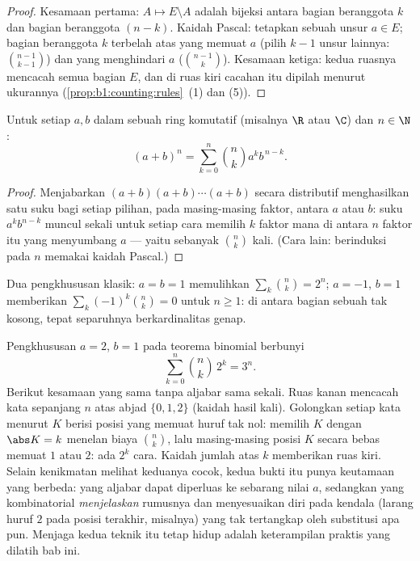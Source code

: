 \begin{proof}
Kesamaan pertama: $A \mapsto E \setminus A$ adalah bijeksi antara
 bagian beranggota $k$ dan  bagian beranggota $(n-k)$. Kaidah Pascal:
tetapkan sebuah unsur $a \in E$;  bagian beranggota $k$ terbelah atas yang memuat
$a$ (pilih $k - 1$ unsur lainnya: $\binom{n-1}{k-1}$) dan yang menghindari
$a$ ($\binom{n-1}{k}$). Kesamaan ketiga: kedua ruasnya mencacah semua  bagian
$E$, dan di ruas kiri cacahan itu dipilah menurut ukurannya
(\cref{prop:b1:counting:rules}~(1) dan (5)).
\end{proof}

\begin{theorem}\label{thm:b1:counting:binomial}
Untuk setiap $a, b$ dalam sebuah ring komutatif (misalnya $\R$ atau $\C$) dan $n \in \N$:
\[
(a + b)^n = \sum_{k=0}^{n} \binom{n}{k} a^k b^{\,n-k} .
\]
\end{theorem}

\begin{proof}
Menjabarkan $(a+b)(a+b)\cdots(a+b)$ secara distributif menghasilkan satu suku bagi setiap
pilihan, pada masing-masing faktor, antara $a$ atau $b$: suku $a^k b^{n-k}$
muncul sekali untuk setiap cara memilih $k$ faktor mana di antara $n$ faktor itu yang
menyumbang $a$ --- yaitu sebanyak $\binom nk$ kali. (Cara lain: berinduksi
pada $n$ memakai kaidah Pascal.)
\end{proof}

\begin{example}\label{ex:b1:counting:binomial}
Dua pengkhususan klasik: $a = b = 1$ memulihkan $\sum_k \binom nk
= 2^n$; $a = -1$, $b = 1$ memberikan $\sum_{k} (-1)^k \binom nk = 0$ untuk
$n \geq 1$: di antara  bagian sebuah  tak kosong, tepat separuhnya
berkardinalitas genap.
\end{example}

\begin{example}\label{ex:b1:counting:threen}
Pengkhususan $a = 2$, $b = 1$ pada teorema binomial berbunyi
\[
\sum_{k=0}^{n} \binom nk\,2^k = 3^n .
\]
Berikut kesamaan yang sama tanpa aljabar sama sekali. Ruas kanan
mencacah kata sepanjang $n$ atas abjad $\{0, 1, 2\}$
(kaidah hasil kali). Golongkan setiap kata menurut  $K$ berisi posisi
yang memuat huruf tak nol: memilih $K$ dengan $\abs K = k$ menelan biaya
$\binom nk$, lalu masing-masing posisi $K$ secara bebas memuat $1$
atau $2$: ada $2^k$ cara. Kaidah jumlah atas $k$ memberikan ruas kiri.
Selain kenikmatan melihat keduanya cocok, kedua bukti itu punya keutamaan
yang berbeda: yang aljabar dapat diperluas ke sebarang nilai $a$, sedangkan yang
kombinatorial \emph{menjelaskan} rumusnya dan menyesuaikan diri pada
kendala (larang huruf $2$ pada posisi terakhir, misalnya) yang
tak tertangkap oleh substitusi apa pun. Menjaga kedua teknik itu tetap hidup adalah
keterampilan praktis yang dilatih bab ini.
\end{example}

